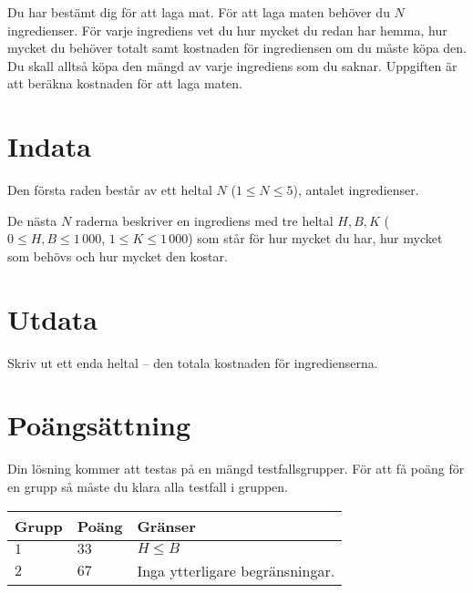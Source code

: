 Du har bestämt dig för att laga mat.
För att laga maten behöver du $N$ ingredienser.
För varje ingrediens vet du hur mycket du redan har hemma, hur mycket du behöver totalt samt kostnaden för ingrediensen om du måste köpa den.
Du skall alltså köpa den mängd av varje ingrediens som du saknar.
Uppgiften är att beräkna kostnaden för att laga maten.

\section*{Indata}
Den första raden består av ett heltal $N$ ($1 \le N \le 5$), antalet ingredienser.

De nästa $N$ raderna beskriver en ingrediens med tre heltal $H, B, K$ ($0 \le H, B \le 1\,000$, $1 \le K \le 1\,000$) som står för hur mycket du har, hur mycket som behövs och hur mycket den kostar.

\section*{Utdata}
Skriv ut ett enda heltal -- den totala kostnaden för ingredienserna.

\section*{Poängsättning}
Din lösning kommer att testas på en mängd testfallsgrupper.
För att få poäng för en grupp så måste du klara alla testfall i gruppen.

\noindent
\begin{tabular}{| l | l | p{12cm} |}
  \hline
  \textbf{Grupp} & \textbf{Poäng} & \textbf{Gränser} \\ \hline
  $1$    & $33$        &  $H \le B$ \\ \hline
  $2$    & $67$        &  Inga ytterligare begränsningar. \\ \hline
\end{tabular}


